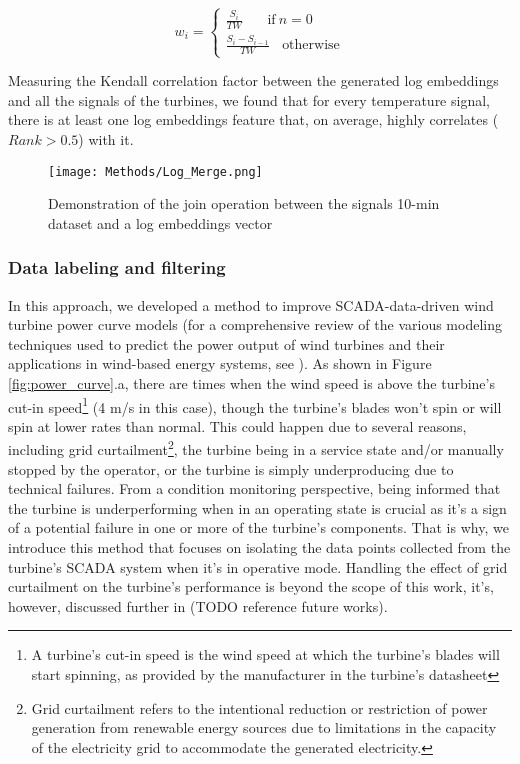     \begin{equation}
      w_i = \begin{cases}
        \frac{S_i}{TW}\ \ \ \ \ \ \ \ \text{if}\ n = 0\\
        \frac{S_i - S_{i-1}}{TW}\ \ \ \ \text{otherwise}
      \end{cases}
    \end{equation}


    Measuring the Kendall correlation factor between the generated log embeddings and all the signals of the turbines, we found that for every temperature signal, there is at least 
    one log embeddings feature that, on average, highly correlates ($Rank>0.5$) with it.

    \begin{figure}[H]
      \begin{center}
        \texttt{[image: Methods/Log\_Merge.png]}
      \end{center}
      \caption{Demonstration of the join operation between the signals 10-min dataset and a log embeddings vector}
      \label{fig:log-merge}
    \end{figure}

    \subsubsection{Data labeling and filtering}
    \label{subsub:PC}
      In this approach, we developed a method to improve SCADA-data-driven wind turbine power curve models 
      (for a comprehensive review of the various modeling techniques used to predict the power output of wind turbines and their applications in wind-based energy systems, 
      see \cite{Power_curves}). As shown in Figure \ref{fig:power_curve}.a, there are times when 
      the wind speed is above the turbine's cut-in speed\footnote{A turbine's cut-in speed is the wind speed at which the turbine's blades will start spinning, 
      as provided by the manufacturer in the turbine's datasheet} (4 m/s in this case), though the turbine's blades won't spin or will spin at lower rates than 
      normal. This could happen due to several reasons, including grid curtailment\footnote{Grid curtailment refers to the intentional reduction or restriction of power 
      generation from renewable energy sources due to limitations in the capacity of the electricity grid to accommodate the generated electricity.}, 
      the turbine being in a service state and/or manually stopped by the operator, or the turbine is simply underproducing due to technical failures.
      From a condition monitoring perspective, being informed that the turbine is underperforming when in an operating state is crucial as it's a sign 
      of a potential failure in one or more of the turbine's components. That is why, we introduce this method that focuses on isolating the data points collected 
      from the turbine's SCADA system when it's in operative mode. Handling the effect of grid curtailment on the turbine's performance is beyond
      the scope of this work, it's, however, discussed further in (TODO reference future works).\\
      
